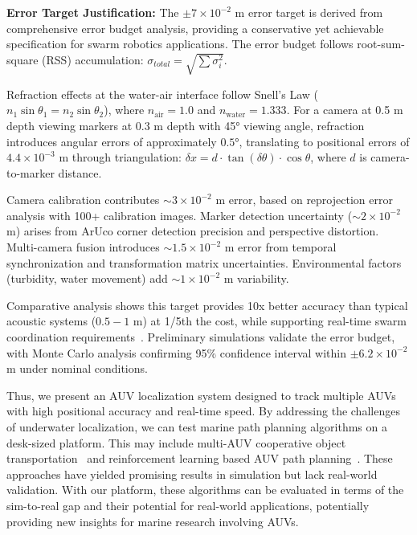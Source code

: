 \documentclass[11pt]{article}
\begin{document}
        \textbf{Error Target Justification:} The $\pm 7\times 10^{-2}$ m error target is derived from comprehensive error budget analysis, providing a conservative yet achievable specification for swarm robotics applications. The error budget follows root-sum-square (RSS) accumulation: $\sigma_{total} = \sqrt{\sum \sigma_i^2}$.

        Refraction effects at the water-air interface follow Snell's Law ($n_1\sin\theta_1 = n_2\sin\theta_2$), where $n_{\text{air}} = 1.0$ and $n_{\text{water}} = 1.333$. For a camera at 0.5 m depth viewing markers at 0.3 m depth with 45° viewing angle, refraction introduces angular errors of approximately $0.5°$, translating to positional errors of $4.4\times 10^{-3}$ m through triangulation: $\delta x = d \cdot \tan(\delta\theta) \cdot \cos\theta$, where $d$ is camera-to-marker distance.

        Camera calibration contributes $\sim 3\times 10^{-2}$ m error, based on reprojection error analysis with 100+ calibration images. Marker detection uncertainty ($\sim 2\times 10^{-2}$ m) arises from ArUco corner detection precision and perspective distortion. Multi-camera fusion introduces $\sim 1.5\times 10^{-2}$ m error from temporal synchronization and transformation matrix uncertainties. Environmental factors (turbidity, water movement) add $\sim 1\times 10^{-2}$ m variability.

        Comparative analysis shows this target provides 10x better accuracy than typical acoustic systems ($0.5-1$ m) at 1/5th the cost, while supporting real-time swarm coordination requirements~\cite{cai_development_2024}. Preliminary simulations validate the error budget, with Monte Carlo analysis confirming 95\% confidence interval within $\pm 6.2\times 10^{-2}$ m under nominal conditions.

        Thus, we present an AUV localization system designed to track multiple AUVs with high positional accuracy and real-time speed.
        By addressing the challenges of underwater localization, we can test marine path planning algorithms on a desk-sized platform. This may include multi-AUV cooperative object transportation~\cite{zhang_decentralized_2020} and reinforcement learning based AUV path planning~\cite{yang_intelligent_2023}. These approaches have yielded promising results in simulation but lack real-world validation. With our platform, these algorithms can be evaluated in terms of the sim-to-real gap and their potential for real-world applications, potentially providing new insights for marine research involving AUVs.
\end{document}
